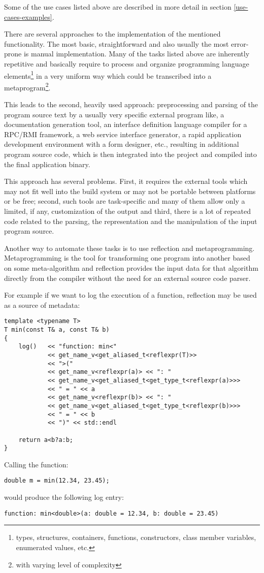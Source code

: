 Some of the use cases listed above are described in more detail in section
\ref{use-cases-examples}.

There are several approaches to the implementation of the mentioned functionality.
The most basic, straightforward and also usually the most
error-prone is manual implementation. Many of the tasks listed above
are inherently repetitive and basically require to process and organize
programming language elements\footnote{types, structures, containers, functions,
constructors, class member variables, enumerated values, etc.}
in a very uniform way which could be transcribed into a metaprogram\footnote{with
varying level of complexity}.

This leads to the second, heavily used approach: preprocessing
and parsing of the program source text by a usually very specific external
program like, a documentation generation tool, an interface definition language
compiler for a RPC/RMI framework, a web service interface generator,
a rapid application development environment with a form designer, etc.,
resulting in additional program source code, which is then integrated into
the project and compiled into the final application binary.

This approach has several problems. First, it requires the external
tools which may not fit well into the build system or may not be portable
between platforms or be free; second, such tools are task-specific
and many of them allow only a limited, if any, customization of the output
and third, there is a lot of repeated code related to the parsing, the
representation and the manipulation of the input program source.

Another way to automate these tasks is to use reflection and metaprogramming.
Metaprogramming is the tool for transforming one program into another based
on some meta-algorithm and reflection provides the input data for that algorithm
directly from the compiler without the need for an external source code parser.

For example if we want to log the execution of a function, reflection may
be used as a source of metadata:

\begin{verbatim}
template <typename T>
T min(const T& a, const T& b)
{
	log()   << "function: min<"
	        << get_name_v<get_aliased_t<reflexpr(T)>>
	        << ">("
	        << get_name_v<reflexpr(a)> << ": "
	        << get_name_v<get_aliased_t<get_type_t<reflexpr(a)>>>
	        << " = " << a
	        << get_name_v<reflexpr(b)> << ": "
	        << get_name_v<get_aliased_t<get_type_t<reflexpr(b)>>>
	        << " = " << b
	        << ")" << std::endl

	return a<b?a:b;
}
\end{verbatim}

Calling the \verb@min@ function:

\begin{verbatim}
double m = min(12.34, 23.45);
\end{verbatim}

would produce the following log entry:

\begin{verbatim}
function: min<double>(a: double = 12.34, b: double = 23.45)
\end{verbatim}

